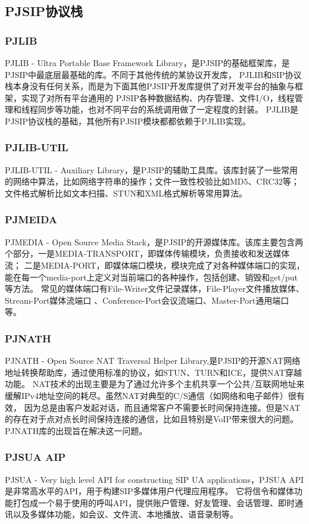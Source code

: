 \documentclass[a4paper,AutoFakeBold,oneside,12pt]{book}
\begin{document}
\subsection{PJSIP协议栈}
\subsubsection{PJLIB}
PJLIB - Ultra Portable Base Framework Library，是PJSIP的基础框架库，是PJSIP中最底层最基础的库。不同于其他传统的某协议开发库，
PJLIB和SIP协议栈本身没有任何关系，而是为下面其他PJSIP开发库提供了对开发平台的抽象与框架，实现了对所有平台通用的
PJSIP各种数据结构、内存管理、文件I/O，线程管理和线程同步等功能，也对不同平台的系统调用做了一定程度的封装。
PJLIB是PJSIP协议栈的基础，其他所有PJSIP模块都都依赖于PJLIB实现。
\subsubsection{PJLIB-UTIL}
PJLIB-UTIL - Auxiliary Library，是PJSIP的辅助工具库。该库封装了一些常用的网络中算法，比如网络字符串的操作；文件一致性校验比如MD5、CRC32等；
文件格式解析比如文本扫描、STUN和XML格式解析等常用算法。
\subsubsection{PJMEIDA}
PJMEDIA - Open Source Media Stack，是PJSIP的开源媒体库。该库主要包含两个部分，一是MEDIA-TRANSPORT，即媒体传输模块，负责接收和发送媒体流；
二是MEDIA-PORT，即媒体端口模块，模块完成了对各种媒体端口的实现，能在每一个media-port上定义对当前端口的各种操作，包括创建、销毁和get/put等方法。
常见的媒体端口有File-Writer文件记录媒体，File-Player文件播放媒体、Stream-Port媒体流端口 、Conference-Port会议流端口、Master-Port通用端口等。
\subsubsection{PJNATH}
PJNATH - Open Source NAT Traversal Helper Library,是PJSIP的开源NAT网络地址转换帮助库，通过使用标准的协议，如STUN、TURN和ICE，提供NAT穿越功能。
NAT技术的出现主要是为了通过允许多个主机共享一个公共/互联网地址来缓解IPv4地址空间的耗尽。虽然NAT对典型的C/S通信（如网络和电子邮件）很有效，
因为总是由客户发起对话，而且通常客户不需要长时间保持连接。但是NAT的存在对于点对点长时间保持连接的通信，比如且特别是VoIP带来很大的问题。
PJNATH库的出现旨在解决这一问题。
\subsubsection{PJSUA AIP}
PJSUA - Very high level API for constructing SIP UA applications，PJSUA API是非常高水平的API，用于构建SIP多媒体用户代理应用程序。
它将信令和媒体功能打包成一个易于使用的呼叫API，提供账户管理、好友管理、会话管理、即时通讯以及多媒体功能，如会议、文件流、本地播放、语音录制等。
\end{document}
